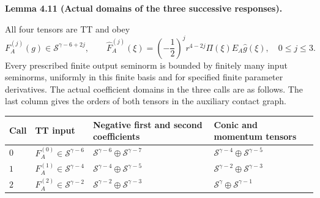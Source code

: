 \documentclass[
  english,
  11pt,
  reqno]{amsart}
\makeatletter
\newcounter{none} %
\newcommand{\pandocstatementheading}[1]{%
  \par\if@nobreak\else
    \addpenalty{\@beginparpenalty}%
    \addvspace{.5\baselineskip plus .2\baselineskip minus .2\baselineskip}%
  \fi
  {\normalfont\bfseries #1\par}%
  \nobreak\@afterindenttrue\@afterheading
}
\makeatother
\begin{document}
\pandocstatementheading{\leavevmode{}\label{lem:online-negative-response-intermediate-orders}Lemma 4.11 (Actual domains of the three successive responses).}

All four tensors are TT and obey%
\[
F_A^{(j)}(g)\in\mathscr S^{\gamma-6+2j},\qquad
\widehat F_A^{(j)}(\xi)
=\left(-\frac12\right)^j r^{4-2j}\Pi(\xi)E_A\widehat g(\xi),
\quad 0\le j\le3.
\] Every prescribed finite output seminorm is bounded by finitely many
input seminorms, uniformly in this finite basis and for specified finite
parameter derivatives. The actual coefficient domains in the three calls
are as follows. The last column gives the orders of both tensors in the
auxiliary contact graph.

{\def\LTcaptype{none} %
\begin{longtable}[]{@{}
  >{\raggedright\arraybackslash}p{}
  >{\raggedright\arraybackslash}p{}
  >{\raggedright\arraybackslash}p{}
  >{\raggedright\arraybackslash}p{}@{}}
\toprule\noalign{}
\begin{minipage}[b]{\linewidth}\raggedright
Call
\end{minipage} & \begin{minipage}[b]{\linewidth}\raggedright
TT input
\end{minipage} & \begin{minipage}[b]{\linewidth}\raggedright
Negative first and second coefficients
\end{minipage} & \begin{minipage}[b]{\linewidth}\raggedright
Conic and momentum tensors
\end{minipage} \\
\midrule\noalign{}
\endhead
\bottomrule\noalign{}
\endlastfoot
\(0\) & \(F_A^{(0)}\in\mathscr S^{\gamma-6}\) &
\(\mathscr S^{\gamma-6}\oplus\mathscr S^{\gamma-7}\) &
\(\mathscr S^{\gamma-4}\oplus\mathscr S^{\gamma-5}\) \\
\(1\) & \(F_A^{(1)}\in\mathscr S^{\gamma-4}\) &
\(\mathscr S^{\gamma-4}\oplus\mathscr S^{\gamma-5}\) &
\(\mathscr S^{\gamma-2}\oplus\mathscr S^{\gamma-3}\) \\
\(2\) & \(F_A^{(2)}\in\mathscr S^{\gamma-2}\) &
\(\mathscr S^{\gamma-2}\oplus\mathscr S^{\gamma-3}\) &
\(\mathscr S^{\gamma}\oplus\mathscr S^{\gamma-1}\) \\
\end{longtable}
}
\end{document}
